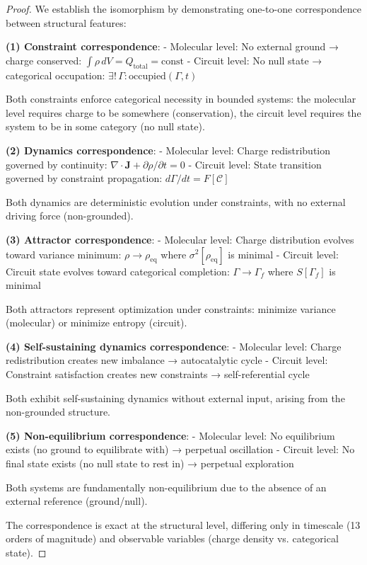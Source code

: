 \documentclass[aps,prd,twocolumn,superscriptaddress,floatfix,nofootinbib]{revtex4-2}
\theoremstyle{remark}
\begin{document}
\begin{proof}
We establish the isomorphism by demonstrating one-to-one correspondence between structural features:

\textbf{(1) Constraint correspondence}:
- Molecular level: No external ground → charge conserved: $\int \rho \, dV = Q_{\text{total}} = \text{const}$
- Circuit level: No null state → categorical occupation: $\exists! \, \Gamma : \text{occupied}(\Gamma, t)$

Both constraints enforce categorical necessity in bounded systems: the molecular level requires charge to be somewhere (conservation), the circuit level requires the system to be in some category (no null state).

\textbf{(2) Dynamics correspondence}:
- Molecular level: Charge redistribution governed by continuity: $\nabla \cdot \mathbf{J} + \partial\rho/\partial t = 0$
- Circuit level: State transition governed by constraint propagation: $d\Gamma/dt = F[\mathcal{C}]$

Both dynamics are deterministic evolution under constraints, with no external driving force (non-grounded).

\textbf{(3) Attractor correspondence}:
- Molecular level: Charge distribution evolves toward variance minimum: $\rho \to \rho_{\text{eq}}$ where $\sigma^2[\rho_{\text{eq}}]$ is minimal
- Circuit level: Circuit state evolves toward categorical completion: $\Gamma \to \Gamma_f$ where $S[\Gamma_f]$ is minimal

Both attractors represent optimization under constraints: minimize variance (molecular) or minimize entropy (circuit).

\textbf{(4) Self-sustaining dynamics correspondence}:
- Molecular level: Charge redistribution creates new imbalance → autocatalytic cycle
- Circuit level: Constraint satisfaction creates new constraints → self-referential cycle

Both exhibit self-sustaining dynamics without external input, arising from the non-grounded structure.

\textbf{(5) Non-equilibrium correspondence}:
- Molecular level: No equilibrium exists (no ground to equilibrate with) → perpetual oscillation
- Circuit level: No final state exists (no null state to rest in) → perpetual exploration

Both systems are fundamentally non-equilibrium due to the absence of an external reference (ground/null).

The correspondence is exact at the structural level, differing only in timescale (13 orders of magnitude) and observable variables (charge density vs. categorical state).
\end{proof}
\end{document}
